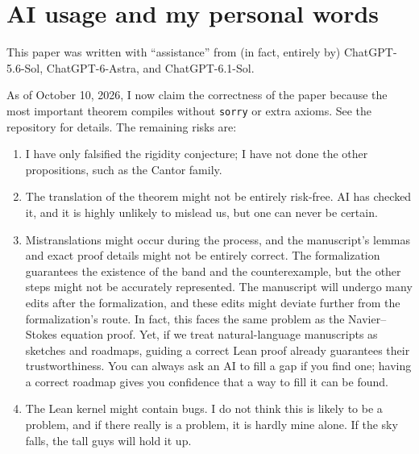 \section*{AI usage and my personal words}
This paper was written with ``assistance'' from (in fact, entirely by)
ChatGPT-5.6-Sol, ChatGPT-6-Astra, and ChatGPT-6.1-Sol.

As of October 10, 2026, I now claim the correctness of the paper because
the most important theorem compiles without \texttt{sorry} or extra axioms.
See the repository for details. The remaining risks are:
\begin{enumerate}
\item I have only falsified the rigidity conjecture; I have not done the
other propositions, such as the Cantor family.
\item The translation of the theorem might not be entirely risk-free.
AI has checked it, and it is highly unlikely to mislead us, but one can
never be certain.
\item Mistranslations might occur during the process, and the manuscript's
lemmas and exact proof details might not be entirely correct. The
formalization guarantees the existence of the band and the counterexample,
but the other steps might not be accurately represented. The manuscript
will undergo many edits after the formalization, and these edits might
deviate further from the formalization's route. In fact, this faces the
same problem as the Navier--Stokes equation proof. Yet, if we treat
natural-language manuscripts as sketches and roadmaps, guiding a correct
Lean proof already guarantees their trustworthiness. You can always ask
an AI to fill a gap if you find one; having a correct roadmap gives you
confidence that a way to fill it can be found.
\item The Lean kernel might contain bugs. I do not think this is likely
to be a problem, and if there really is a problem, it is hardly mine
alone. If the sky falls, the tall guys will hold it up.
\end{enumerate}

